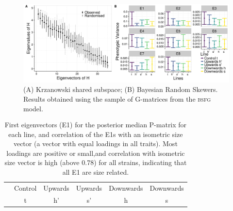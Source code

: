 \begin{refsection}
\begin{figure}
\centering
\includegraphics[width = \linewidth]{chapter_ratones/media/SI/figureS8_Fig2Gversion.png}
\caption[G matrix shared subspace]{(A) Krzanowski shared subspace; (B) Bayesian Random Skewers. Results obtained using the sample of G-matrices from the \textsc{bsfg} model.}
\label{figsup:krzG}
\end{figure}

\begin{table}
    \centering
    \caption[First eigenvectors per line]{First eigenvectors (E1) for the posterior median P-matrix for each line, and correlation of the E1s with an isometric size vector (a vector with equal loadings in all traits). Most loadings are positive or small,and correlation with isometric size vector is high (above 0.78) for all strains, indicating that all E1 are size related.}
    \begin{tabular}{rccccc}
        \hline
      & Control & Upwards  & Upwards & Downwards & Downwards  \\
                & t & h' &  s' &  h &  s \\


\end{tabular}
\end{table}
\end{refsection}
